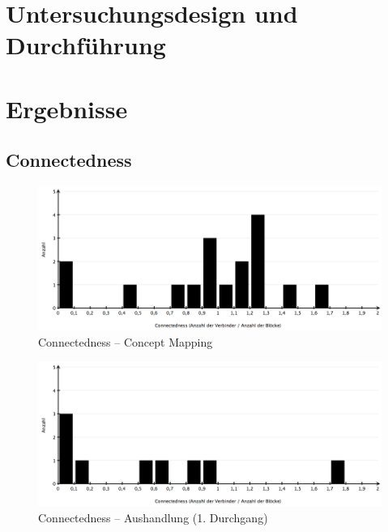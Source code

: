 
\section{Untersuchungsdesign und Durchführung} %
\label{sec:m_untersuchungsdesign}


\section{Ergebnisse} %
\label{sec:m_ergebnisse}


\subsection{Connectedness} %
\label{sub:connectedness}

\begin{figure}[htbp]
	\centering
		\includegraphics[width=12cm]{img/Evaluierung/connectednessConceptMapping.png}
	\caption{Connectedness -- Concept Mapping}
	\label{fig:img_Evaluierung_connectednessConceptMapping}
\end{figure}

\begin{figure}[htbp]
	\centering
		\includegraphics[width=12cm]{img/Evaluierung/connectednessAushandlung1.png}
	\caption{Connectedness -- Aushandlung (1. Durchgang)}
	\label{fig:img_Evaluierung_connectednessAushandlung1}
\end{figure}

